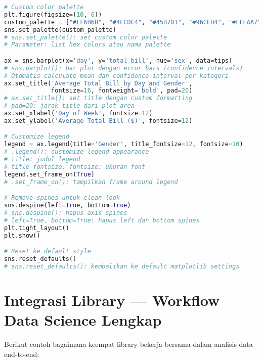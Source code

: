 \begin{lstlisting}[language=python, caption={Styling dan Customization Advanced}, style=python]
# Custom color palette
plt.figure(figsize=(10, 6))
custom_palette = ["#FF6B6B", "#4ECDC4", "#45B7D1", "#96CEB4", "#FFEAA7"]
sns.set_palette(custom_palette)
# sns.set_palette(): set custom color palette
# Parameter: list hex colors atau nama palette

ax = sns.barplot(x='day', y='total_bill', hue='sex', data=tips)
# sns.barplot(): bar plot dengan error bars (confidence intervals)
# Otomatis calculate mean dan confidence interval per kategori
ax.set_title('Average Total Bill by Day and Gender',
             fontsize=16, fontweight='bold', pad=20)
# ax.set_title(): set title dengan custom formatting
# pad=20: jarak title dari plot area
ax.set_xlabel('Day of Week', fontsize=12)
ax.set_ylabel('Average Total Bill ($)', fontsize=12)

# Customize legend
legend = ax.legend(title='Gender', title_fontsize=12, fontsize=10)
# .legend(): customize legend appearance
# title: judul legend
# title_fontsize, fontsize: ukuran font
legend.set_frame_on(True)
# .set_frame_on(): tampilkan frame around legend

# Remove spines untuk clean look
sns.despine(left=True, bottom=True)
# sns.despine(): hapus axis spines
# left=True, bottom=True: hapus left dan bottom spines
plt.tight_layout()
plt.show()

# Reset ke default style
sns.reset_defaults()
# sns.reset_defaults(): kembalikan ke default matplotlib settings
\end{lstlisting}

\section{Integrasi Library — Workflow Data Science Lengkap}

Berikut contoh bagaimana keempat library bekerja bersama dalam analisis data end-to-end:

